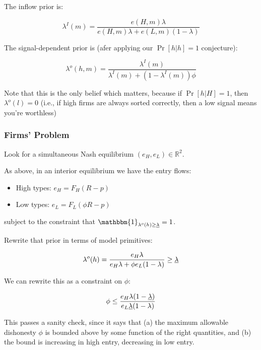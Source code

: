 \documentclass{article}
\begin{document}
The inflow prior is: 

\begin{equation}
    \lambda^I(m) = \frac{e(H, m)\lambda}{e(H,m)\lambda + e(L, m)(1-\lambda)}
\end{equation}

The signal-dependent prior is (afer applying our $\Pr[h | h] = 1$ conjecture): 

\begin{equation}
    \lambda^o(h, m) = \frac{\lambda^I(m)}{\lambda^I(m) + (1-\lambda^I(m))\phi}
\end{equation}

Note that this is the only belief which matters, because if $\Pr[h | H] = 1$, then $\lambda^o(l) = 0$ (i.e., if high firms are always sorted correctly, then a low signal means you're worthless)

\subsubsection*{Firms' Problem}

Look for a simultaneous Nash equilibrium $(e_H, e_L) \in \mathbb{R}^2$. 

As above, in an interior equilibrium we have the entry flows: 

\begin{itemize}
    \item High types: $e_H = F_H(R - p)$
    \item Low types: $e_L = F_L(\phi R - p)$ 
\end{itemize}

subject to the constraint that $\mathbbm{1}_{\lambda^o(h) \geq \uline{\lambda}} = 1$.

Rewrite that prior in terms of model primitives: 

\begin{equation}
    \lambda^o(h) = \frac{e_H \lambda}{e_H \lambda + \phi e_L (1 - \lambda)} \geq \uline{\lambda}
\end{equation}

We can rewrite this as a constraint on $\phi$: 

\begin{equation}
    \phi \leq \frac{e_H \lambda (1 - \uline{\lambda})}{e_L \uline{\lambda} (1 - \lambda)}
\end{equation} 

This passes a sanity check, since it says that (a) the maximum allowable dishonesty $\phi$ is bounded above by some function of the right quantities, and (b) the bound is increasing in high entry, decreasing in low entry.
\end{document}

